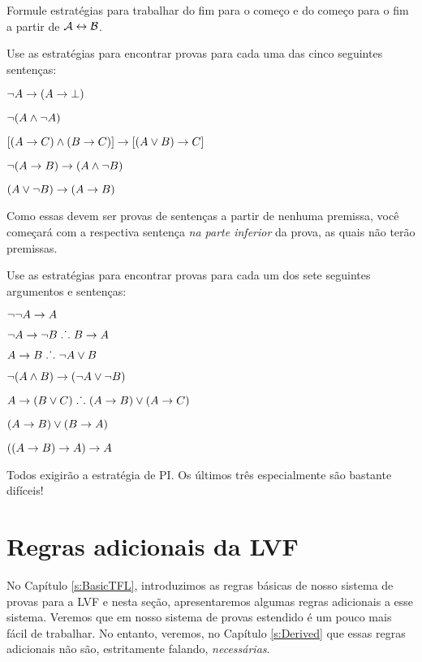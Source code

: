 \problempart
Formule estratégias para trabalhar do fim para o começo e do começo para o fim a partir de $\mathcal{A} \leftrightarrow \mathcal{B}$.

\problempart
Use as estratégias para encontrar provas para cada uma das cinco seguintes sentenças:
\begin{earg}
\item $\neg A \rightarrow (A \rightarrow \bot)$
\item $\neg(A \wedge \neg A)$
\item $[(A \rightarrow C) \wedge (B \rightarrow C)] \rightarrow [(A \lor B) \rightarrow C]$
\item $\neg(A \rightarrow B) \rightarrow (A \wedge \neg B)$
\item $(A \vee \neg B) \rightarrow (A \rightarrow B)$
\end{earg}


Como essas devem ser provas de sentenças a partir de nenhuma premissa, você começará com a respectiva sentença \emph{na parte inferior} da prova, as quais não terão premissas.

\problempart
Use as estratégias para encontrar provas para cada um dos sete seguintes argumentos e sentenças:
\begin{earg}
\item $\neg\neg A \rightarrow A$
\item $\neg A \rightarrow \neg B \mathrel{\ldotp\dot{}\,\ldotp} B \rightarrow A$
\item $A \rightarrow B \mathrel{\ldotp\dot{}\,\ldotp} \neg A \vee B$
\item $\neg(A \wedge B) \rightarrow (\neg A \vee \neg B)$
\item $A \rightarrow (B \vee C) \mathrel{\ldotp\dot{}\,\ldotp} (A \rightarrow B) \vee (A \rightarrow C)$
\item $(A \rightarrow B) \lor (B \rightarrow A)$
\item $((A \rightarrow B) \rightarrow A) \rightarrow A$
\end{earg}
Todos exigirão a estratégia de PI. Os últimos três especialmente são bastante difíceis!


\chapter{Regras adicionais da LVF}\label{s:Further}
No Capítulo \ref{s:BasicTFL}, introduzimos as regras básicas de nosso sistema de provas para a LVF e nesta seção, apresentaremos algumas regras adicionais a esse sistema.  Veremos que em  nosso sistema de provas estendido é um pouco mais fácil de trabalhar.  No entanto, veremos, no Capítulo \ref{s:Derived} que essas regras adicionais não são, estritamente falando, \emph{necessárias}.

